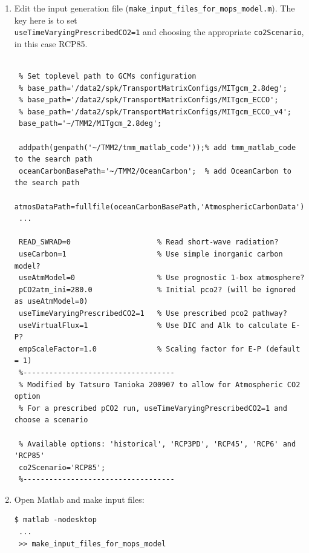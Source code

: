 \documentclass[a4paper]{article}
\begin{document}
\begin{enumerate}
\item Edit the input generation file (\verb|make_input_files_for_mops_model.m|). The key here is to set \\ \verb|useTimeVaryingPrescribedCO2=1| and choosing the appropriate \verb|co2Scenario|, in this case RCP85. 
\lstset{language=matlab} 
\begin{lstlisting}[frame=single,basicstyle=\scriptsize,commentstyle=\color{blue}]
 % make_input_files_for_mops_model.m
 
 % Set toplevel path to GCMs configuration
 % base_path='/data2/spk/TransportMatrixConfigs/MITgcm_2.8deg';
 % base_path='/data2/spk/TransportMatrixConfigs/MITgcm_ECCO';
 % base_path='/data2/spk/TransportMatrixConfigs/MITgcm_ECCO_v4';
 base_path='~/TMM2/MITgcm_2.8deg';
 
 addpath(genpath('~/TMM2/tmm_matlab_code'));% add tmm_matlab_code to the search path
 oceanCarbonBasePath='~/TMM2/OceanCarbon';  % add OceanCarbon to the search path
 atmosDataPath=fullfile(oceanCarbonBasePath,'AtmosphericCarbonData');
 ...
  
 READ_SWRAD=0                    % Read short-wave radiation?
 useCarbon=1                     % Use simple inorganic carbon model?
 useAtmModel=0                   % Use prognostic 1-box atmosphere?
 pCO2atm_ini=280.0               % Initial pco2? (will be ignored as useAtmModel=0)
 useTimeVaryingPrescribedCO2=1   % Use prescribed pco2 pathway?
 useVirtualFlux=1                % Use DIC and Alk to calculate E-P?
 empScaleFactor=1.0              % Scaling factor for E-P (default = 1)
 %-----------------------------------
 % Modified by Tatsuro Tanioka 200907 to allow for Atmospheric CO2 option
 % For a prescribed pCO2 run, useTimeVaryingPrescribedCO2=1 and choose a scenario
 
 % Available options: 'historical', 'RCP3PD', 'RCP45', 'RCP6' and 'RCP85'
 co2Scenario='RCP85';
 %-----------------------------------
\end{lstlisting}

\item Open Matlab and make input files:
\begin{lstlisting}[style=DOS]
 $ matlab -nodesktop
 ...
 >> make_input_files_for_mops_model
\end{lstlisting}


\end{enumerate}
\end{document}
